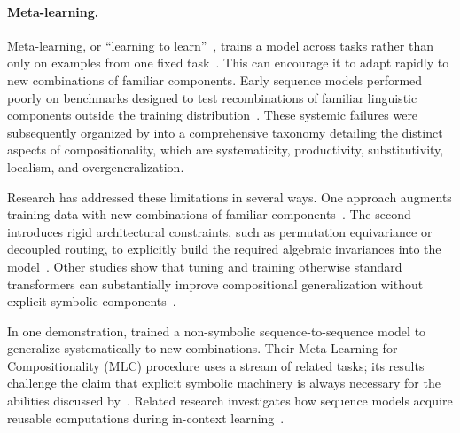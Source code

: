 \documentclass[acmsmall,screen,review,anonymous]{acmart}
\begin{document}
\paragraph{Meta-learning.}
Meta-learning, or ``learning to learn''~\citep{Schmidhuber1987EvolutionaryPI, Thrun-1998-16516, finn2017modelagnosticmetalearningfastadaptation}, trains a model across tasks rather than only on examples from one fixed task~\citep{wang2017learningreinforcementlearn, Hochreiter2001}.
%
This can encourage it to adapt rapidly to new combinations of familiar components.
%
Early sequence models performed poorly on benchmarks designed to test recombinations of familiar linguistic components outside the training distribution~\citep{lake2018compskill, keysers2020measuringcompositionalgeneralizationcomprehensive, kim-linzen-2020-cogs, bahdanau2020closureassessingsystematicgeneralization}.
%
These systemic failures were subsequently organized by \citet{ijcai2020p708} into a comprehensive taxonomy detailing the distinct aspects of compositionality, which are systematicity, productivity, substitutivity, localism, and overgeneralization.

Research has addressed these limitations in several ways.
%
One approach augments training data with new combinations of familiar components~\citep{andreas2020good, weyrich2022compositional}.
%
The second introduces rigid architectural constraints, such as permutation equivariance or decoupled routing, to explicitly build the required algebraic invariances into the model~\citep{gordon2020permutation, li2023compositional}. 
%
Other studies show that tuning and training otherwise standard transformers can substantially improve compositional generalization without explicit symbolic components~\citep{csordas2021devil, ontanon2022making, drakard2024logical}.

In one demonstration, \citet{Lake2023-ut} trained a non-symbolic sequence-to-sequence model to generalize systematically to new combinations.
%
Their Meta-Learning for Compositionality (MLC) procedure uses a stream of related tasks; its results challenge the claim that explicit symbolic machinery is always necessary for the abilities discussed by~\citet{fodorpylyshyn1988}.
%
Related research investigates how sequence models acquire reusable computations during in-context learning~\citep{pmlr-v202-von-oswald23a, dai-etal-2023-gpt, olsson2022incontextlearninginductionheads}.
\end{document}
